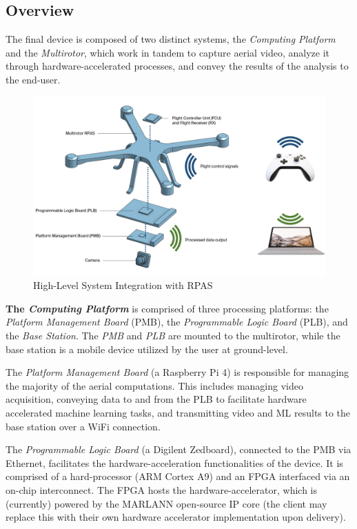 \subsection{Overview}
The final device is composed of two distinct systems, the \textit{Computing Platform} and the \textit{Multirotor}, which work in tandem to capture aerial video, analyze it through hardware-accelerated processes, and convey the results of the analysis to the end-user. 

\begin{figure}[H]\label{hlpic}
    \centering
    \includegraphics[width=\linewidth]{img/intpic.png}
\caption{High-Level System Integration with RPAS}
\end{figure}

\textbf{The \textit{Computing Platform}} is comprised of three processing platforms: the \textit{Platform Management Board} (PMB), the \textit{Programmable Logic Board} (PLB), and the \textit{Base Station}. The \textit{PMB} and \textit{PLB} are mounted to the multirotor, while the base station is a mobile device utilized by the user at ground-level.

The \textit{Platform Management Board} (a Raspberry Pi 4) is responsible for managing the majority of the aerial computations. This includes managing video acquisition, conveying data to and from the PLB to facilitate hardware accelerated machine learning tasks, and transmitting video and ML results to the base station over a WiFi connection.

The \textit{Programmable Logic Board} (a Digilent Zedboard), connected to the PMB via Ethernet, facilitates the hardware-acceleration functionalities of the device. It is comprised of a hard-processor (ARM Cortex A9) and an FPGA interfaced via an on-chip interconnect. The FPGA hosts the hardware-accelerator, which is (currently) powered by the MARLANN open-source IP core (the client may replace this with their own hardware accelerator implementation upon delivery).

